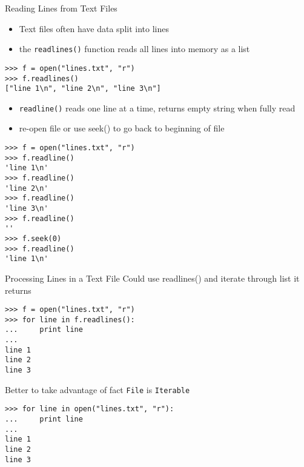 \documentclass[smaller, aspectratio=1610]{beamer}
\begin{document}
\begin{frame}[label={sec:org807782f},fragile]{Reading Lines from Text Files}
 \begin{itemize}
\item Text files often have data split into lines
\item the \texttt{readlines()} function reads all lines into memory as a list
\end{itemize}

\lstset{language=Python,label= ,caption= ,captionpos=b,numbers=none}
\begin{lstlisting}
>>> f = open("lines.txt", "r")
>>> f.readlines()
["line 1\n", "line 2\n", "line 3\n"]
\end{lstlisting}

\begin{itemize}
\item \texttt{readline()} reads one line at a time, returns empty string when fully read
\item re-open file or use seek() to go back to beginning of file
\end{itemize}

\lstset{language=Python,label= ,caption= ,captionpos=b,numbers=none}
\begin{lstlisting}
>>> f = open("lines.txt", "r")
>>> f.readline()
'line 1\n'
>>> f.readline()
'line 2\n'
>>> f.readline()
'line 3\n'
>>> f.readline()
''
>>> f.seek(0)
>>> f.readline()
'line 1\n'
\end{lstlisting}
\end{frame}

\begin{frame}[label={sec:org72b6830},fragile]{Processing Lines in a Text File}
 Could use readlines() and iterate through list it returns

\lstset{language=Python,label= ,caption= ,captionpos=b,numbers=none}
\begin{lstlisting}
>>> f = open("lines.txt", "r")
>>> for line in f.readlines():
...     print line
...
line 1
line 2
line 3
\end{lstlisting}

Better to take advantage of fact \texttt{File} is \texttt{Iterable}

\lstset{language=Python,label= ,caption= ,captionpos=b,numbers=none}
\begin{lstlisting}
>>> for line in open("lines.txt", "r"):
...     print line
...
line 1
line 2
line 3
\end{lstlisting}
\end{frame}
\end{document}

